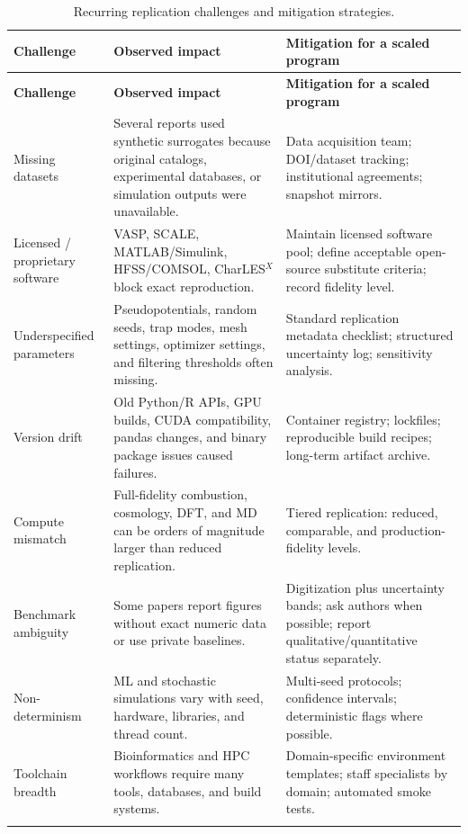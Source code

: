 \documentclass[11pt,letterpaper]{article}
\begin{document}
\begin{longtable}{p{3.5cm}p{6.5cm}p{6.0cm}}
\toprule
\textbf{Challenge} & \textbf{Observed impact} & \textbf{Mitigation for a scaled program} \\
\midrule
\endfirsthead
\toprule
\textbf{Challenge} & \textbf{Observed impact} & \textbf{Mitigation for a scaled program} \\
\midrule
\endhead
Missing datasets & Several reports used synthetic surrogates because original catalogs, experimental databases, or simulation outputs were unavailable. & Data acquisition team; DOI/dataset tracking; institutional agreements; snapshot mirrors. \\
\addlinespace
Licensed / proprietary software & VASP, SCALE, MATLAB/Simulink, HFSS/COMSOL, CharLES$^X$ block exact reproduction. & Maintain licensed software pool; define acceptable open-source substitute criteria; record fidelity level. \\
\addlinespace
Underspecified parameters & Pseudopotentials, random seeds, trap modes, mesh settings, optimizer settings, and filtering thresholds often missing. & Standard replication metadata checklist; structured uncertainty log; sensitivity analysis. \\
\addlinespace
Version drift & Old Python/R APIs, GPU builds, CUDA compatibility, pandas changes, and binary package issues caused failures. & Container registry; lockfiles; reproducible build recipes; long-term artifact archive. \\
\addlinespace
Compute mismatch & Full-fidelity combustion, cosmology, DFT, and MD can be orders of magnitude larger than reduced replication. & Tiered replication: reduced, comparable, and production-fidelity levels. \\
\addlinespace
Benchmark ambiguity & Some papers report figures without exact numeric data or use private baselines. & Digitization plus uncertainty bands; ask authors when possible; report qualitative/quantitative status separately. \\
\addlinespace
Non-determinism & ML and stochastic simulations vary with seed, hardware, libraries, and thread count. & Multi-seed protocols; confidence intervals; deterministic flags where possible. \\
\addlinespace
Toolchain breadth & Bioinformatics and HPC workflows require many tools, databases, and build systems. & Domain-specific environment templates; staff specialists by domain; automated smoke tests. \\
\bottomrule
\caption{Recurring replication challenges and mitigation strategies.}
\end{longtable}
\end{document}
